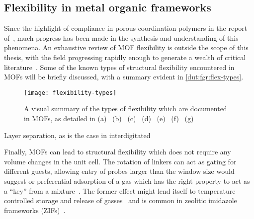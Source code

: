 \subsection{Flexibility in metal organic frameworks}

Since the highlight of compliance in porous coordination polymers 
in the report of~\citet{kitauraPorousCoordinationPolymerCrystals2003},
much progress has been made in the synthesis and understanding
of this phenomena. An exhaustive review of MOF flexibility is 
outside the scope of this thesis, with the field progressing 
rapidly enough to generate a wealth of critical
literature~\cite{schneemannFlexibleMetalOrganic2014, %
fereyHybridPorousSolids2008, liMetalOrganicFrameworks2012, %
haldarInterpenetrationCoordinationPolymers2015, %
stassenUpdatedRoadmapIntegration2017, %
vanduyfhuysThermodynamicInsightStimuliresponsive2018}.
Some of the known types of structural flexibility encountered in MOFs
will be briefly discussed, with a summary evident in \autoref{dut:fgr:flex-types}. 

\begin{figure}[htb]
    \centering
    
    \texttt{[image: flexibility-types]}%
    \caption{A visual summary of the types of flexibility
    which are documented in MOFs, as detailed in 
    (a)~\citet{liHydrogenBondregulatedMicroporous2001}
    (b)~\citet{kitauraPorousCoordinationPolymerCrystals2003}
    (c)~\citet{kitauraPillaredLayerCoordinationPolymer2002}
    (d)~\citet{kepertVersatileFamilyInterconvertible2000,%
    kitauraPorousCoordinationPolymerCrystals2003}
    (e)~\citet{nelsonSupercriticalProcessingRoute2009}
    (f)~\citet{fairen-jimenezOpeningGateFramework2011}
    (g)~\citet{bourrellyDifferentAdsorptionBehaviors2005, %
    serreExplanationVeryLarge2007}}%
    \label{dut:fgr:flex-types}
    
\end{figure}

Layer separation, as is the case in interdigitated 

Finally, MOFs can lead to structural flexibility which does not
require any volume changes in the unit cell. The rotation of linkers
can act as gating for different guests, allowing entry of probes
larger than the window size would suggest or preferential adsorption
of a gas which has the right property to act as a ``key'' from 
a mixture~\cite{seoPillaredLayerCoordinationPolymer2009}. 
The former effect might lend itself to temperature 
controlled storage and release of gasses~\cite{bunzenAchievingLargeVolumetric2018}
and is common in zeolitic imidazole frameworks 
(ZIFs)~\cite{fairen-jimenezOpeningGateFramework2011}.


